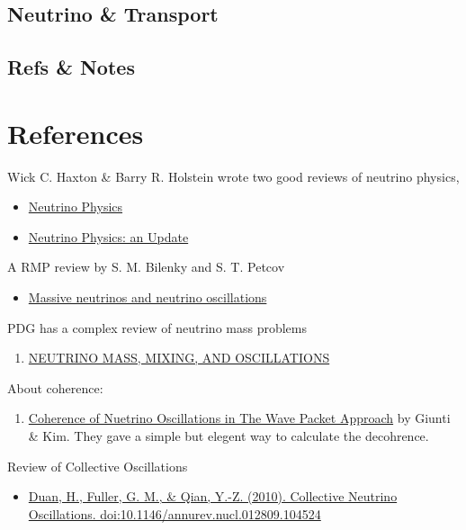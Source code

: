 \documentclass[letterpaper,12pt,english]{sphinxmanual}
\begin{document}
\section{Neutrino \& Transport}
\label{misc:neutrino-transport}

\section{Refs \& Notes}
\label{misc:refs-notes}

\chapter{References}
\label{ref:references}\label{ref::doc}
Wick C. Haxton \& Barry R. Holstein wrote two good reviews of neutrino physics,
\begin{itemize}
\item {} 
\href{http://arxiv.org/abs/hep-ph/9905257v1}{Neutrino Physics}

\item {} 
\href{http://arxiv.org/abs/hep-ph/0306282v1}{Neutrino Physics: an Update}

\end{itemize}

A RMP review by S. M. Bilenky and S. T. Petcov
\begin{itemize}
\item {} 
\href{http://journals.aps.org/rmp/abstract/10.1103/RevModPhys.59.671}{Massive neutrinos and neutrino oscillations}

\end{itemize}

PDG has a complex review of neutrino mass problems
\begin{enumerate}
\item {} 
\href{http://pdg.lbl.gov/2012/reviews/rpp2012-rev-neutrino-mixing.pdf}{NEUTRINO MASS, MIXING, AND OSCILLATIONS}

\end{enumerate}

About coherence:
\begin{enumerate}
\item {} 
\href{http://journals.aps.org/prd/abstract/10.1103/PhysRevD.58.017301}{Coherence of Nuetrino Oscillations in The Wave Packet Approach} by Giunti \& Kim. They gave a simple but elegent way to calculate the decohrence.

\end{enumerate}

Review of Collective Oscillations
\begin{itemize}
\item {} 
\href{http://arxiv.org/abs/1001.2799}{Duan, H., Fuller, G. M., \& Qian, Y.-Z. (2010). Collective Neutrino Oscillations. doi:10.1146/annurev.nucl.012809.104524}

\end{itemize}
\end{document}
